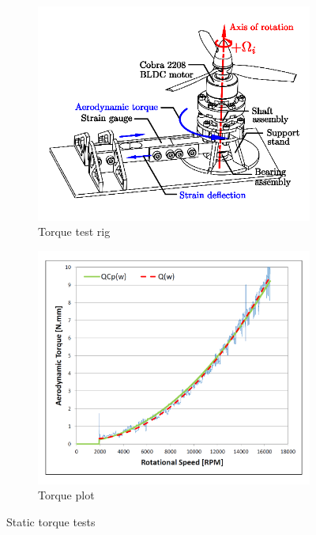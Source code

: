 \par
\begin{figure}[hbtp]
\begin{subfigure}{0.5\textwidth}
\centering
\includegraphics[width=\textwidth]{figs/torque-rig}
\vspace{-20pt}
\caption{Torque test rig}
\label{fig:torque-rig}
\end{subfigure}
\begin{subfigure}{0.5\textwidth}
\centering
\includegraphics[width=\textwidth]{graphs/torque-plot}
\vspace{-20pt}
\caption{Torque plot}
\label{fig:torque-plot}
\end{subfigure}
\caption{Static torque tests}
\label{fig:torques}
\vspace{-8pt}
\end{figure}
